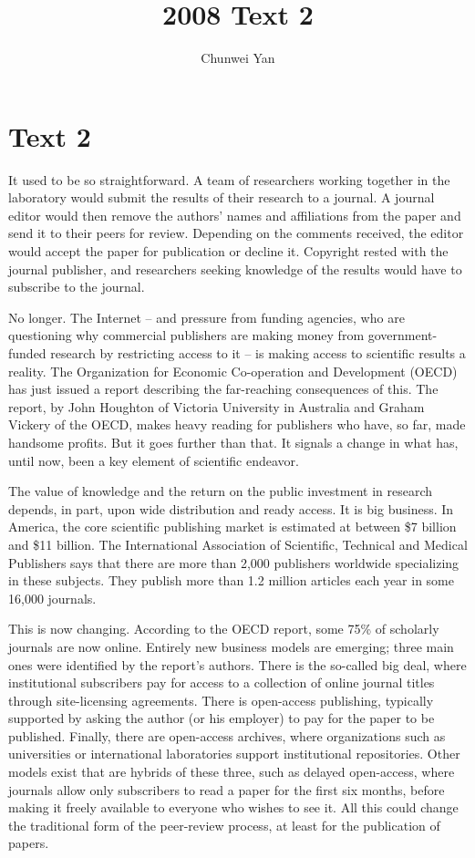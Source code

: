 \documentclass[a4paper]{ctexart}
\author{Chunwei Yan}
\title{2008 Text 2}
\begin{document}
    \maketitle
\section{Text 2}
It used to be so straightforward. A team of researchers working together in the laboratory would submit the results of their research to a journal. A journal editor would then remove the authors’ names and affiliations from the paper and send it to their peers for review. Depending on the comments received, the editor would accept the paper for publication or decline it. Copyright rested with the journal publisher, and researchers seeking knowledge of the results would have to subscribe to the journal.
\par
No longer. The Internet – and pressure from funding agencies, who are questioning why commercial publishers are making money from government-funded research by restricting access to it – is making access to scientific results a reality. The Organization for Economic Co-operation and Development (OECD) has just issued a report describing the far-reaching consequences of this. The report, by John Houghton of Victoria University in Australia and Graham Vickery of the OECD, makes heavy reading for publishers who have, so far, made handsome profits. But it goes further than that. It signals a change in what has, until now, been a key element of scientific endeavor.
\par
The value of knowledge and the return on the public investment in research depends, in part, upon wide distribution and ready access. It is big business. In America, the core scientific publishing market is estimated at between \$7 billion and \$11 billion. The International Association of Scientific, Technical and Medical Publishers says that there are more than 2,000 publishers worldwide specializing in these subjects. They publish more than 1.2 million articles each year in some 16,000 journals.
\par
This is now changing. According to the OECD report, some 75\% of scholarly journals are now online. Entirely new business models are emerging; three main ones were identified by the report’s authors. There is the so-called big deal, where institutional subscribers pay for access to a collection of online journal titles through site-licensing agreements. There is open-access publishing, typically supported by asking the author (or his employer) to pay for the paper to be published. Finally, there are open-access archives, where organizations such as universities or international laboratories support institutional repositories. Other models exist that are hybrids of these three, such as delayed open-access, where journals allow only subscribers to read a paper for the first six months, before making it freely available to everyone who wishes to see it. All this could change the traditional form of the peer-review process, at least for the publication of papers.
\end{document}
